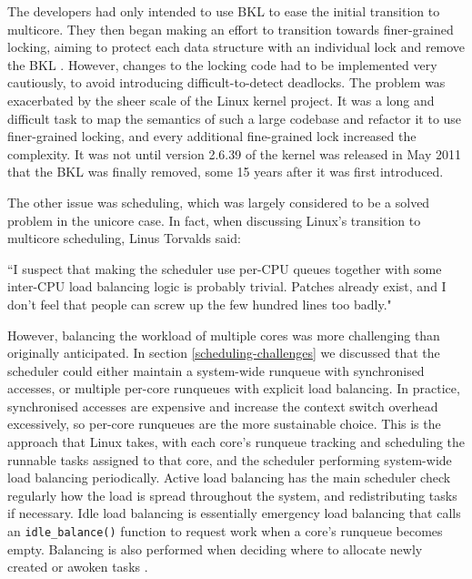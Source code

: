 \documentclass[bsc,frontabs,singlespacing,parskip,deptreport]{infthesis}
\begin{document}
The developers had only intended to use BKL to ease the initial transition to multicore. They then began making an effort to transition towards finer-grained locking, aiming to protect each data structure with an individual lock and remove the BKL \cite{locking-smp-kernels}. However, changes to the locking code had to be implemented very cautiously, to avoid introducing difficult-to-detect deadlocks. The problem was exacerbated by the sheer scale of the Linux kernel project.  It was a long and difficult task to map the semantics of such a large codebase and refactor it to use finer-grained locking, and every additional fine-grained lock increased the complexity. It was not until version 2.6.39 of the kernel was released in May 2011 that the BKL was finally removed, some 15 years after it was first introduced. 

The other issue was scheduling, which was largely considered to be a solved problem in the unicore case. In fact, when discussing Linux's transition to multicore scheduling, Linus Torvalds said:

\begin{displayquote}
``I suspect that making the
scheduler use per-CPU queues together with some inter-CPU load balancing
logic is probably trivial. Patches already exist, and I don't feel that
people can screw up the few hundred lines too badly." \cite{lwn-sched-easy}
\end{displayquote} 

However, balancing the workload of multiple cores was more challenging than originally anticipated. In section \ref{scheduling-challenges} we discussed that the scheduler could either maintain a system-wide runqueue with synchronised accesses, or multiple per-core runqueues with explicit load balancing. In practice, synchronised accesses are expensive and increase the context switch overhead excessively, so per-core runqueues are the more sustainable choice. This is the approach that Linux takes, with each core's runqueue tracking and scheduling the runnable tasks assigned to that core, and the scheduler performing system-wide load balancing periodically. Active load balancing has the main scheduler check regularly how the load is spread throughout the system, and redistributing tasks if necessary. Idle load balancing is essentially emergency load balancing that calls an \verb|idle_balance()| function to request work when a core's runqueue becomes empty. Balancing is also performed when deciding where to allocate newly created or awoken tasks \cite{seeker}. 
\end{document}
